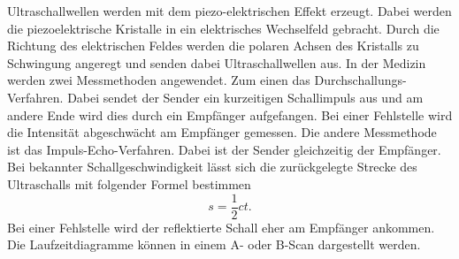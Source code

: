Ultraschallwellen werden mit dem piezo-elektrischen Effekt erzeugt.
Dabei werden die piezoelektrische Kristalle in ein elektrisches Wechselfeld gebracht.
Durch die Richtung des elektrischen Feldes werden die polaren Achsen des Kristalls zu Schwingung angeregt und
senden dabei Ultraschallwellen aus.
In der Medizin werden zwei Messmethoden angewendet.
Zum einen das Durchschallungs-Verfahren.
Dabei sendet der Sender ein kurzeitigen Schallimpuls aus und am andere Ende wird dies durch ein Empfänger aufgefangen.
Bei einer Fehlstelle wird die Intensität abgeschwächt am Empfänger gemessen.
Die andere Messmethode ist das Impuls-Echo-Verfahren. Dabei ist der Sender gleichzeitig der Empfänger. Bei bekannter Schallgeschwindigkeit
lässt sich die zurückgelegte Strecke des Ultraschalls mit folgender Formel bestimmen
\begin{equation}
  s=\frac{1}{2} c t.
  \label{eq:6}
\end{equation}
Bei einer Fehlstelle wird der reflektierte Schall eher am Empfänger ankommen.
Die Laufzeitdiagramme können in einem A- oder B-Scan dargestellt werden.
